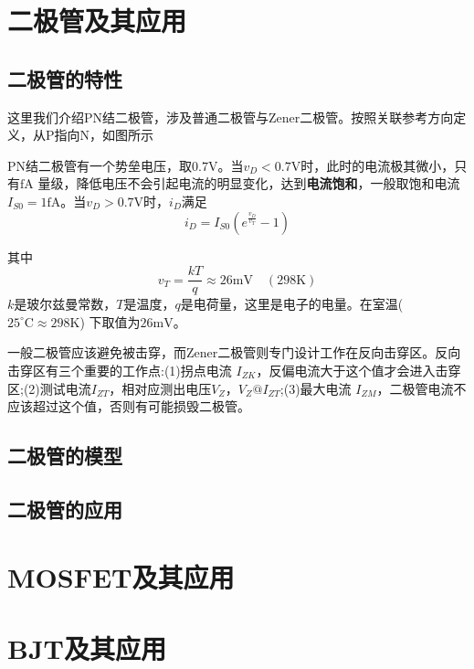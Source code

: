 \documentclass[UTF8,openany]{ctexbook}
\begin{document}
    \section{二极管及其应用}
    \subsection{二极管的特性}
    \par 这里我们介绍PN结二极管，涉及普通二极管与Zener二极管。按照关联参考方向定义，从P指向N，如图所示
    \begin{center}
        \qquad\qquad\qquad
    \end{center}
    \par PN结二极管有一个势垒电压，取$0.7\mathrm{V}$。当$v_D<0.7\mathrm{V}$时，此时的电流极其微小，只有$\mathrm{fA}$
    量级，降低电压不会引起电流的明显变化，达到\textbf{电流饱和}，一般取饱和电流$I_{S0}=1\mathrm{fA}$。当$v_D>0.7\mathrm{V}$时，$i_D$满足
    \[
    i_D=I_{S0}(e^{\frac{v_D}{v_T}}-1)    
    \]
    \par 其中
    \[
    v_T=\frac{kT}{q}\approx 26\mathrm{mV}\quad(298\mathrm{K})    
    \]
    $k$是玻尔兹曼常数，$T$是温度，$q$是电荷量，这里是电子的电量。在室温($25^\circ \mathrm{C}\approx298\mathrm{K}$)
    下取值为$26\mathrm{mV}$。
    \par 一般二极管应该避免被击穿，而Zener二极管则专门设计工作在反向击穿区。反向击穿区有三个重要的工作点:(1)拐点电流
    $I_{ZK}$，反偏电流大于这个值才会进入击穿区;(2)测试电流$I_{ZT}$，相对应测出电压$V_Z$，$V_Z@I_{ZT}$;(3)最大电流
    $I_{ZM}$，二极管电流不应该超过这个值，否则有可能损毁二极管。
    \subsection{二极管的模型}
    \subsection{二极管的应用}

    \section{MOSFET及其应用}
    \section{BJT及其应用}
\end{document}
